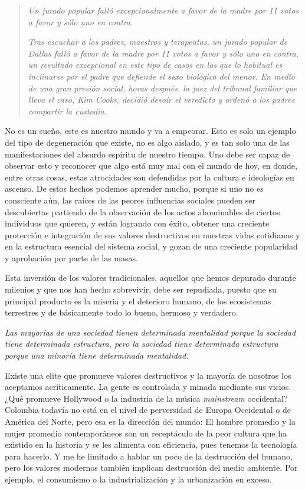\documentclass[12pt]{article}
\begin{document}
	\blockquote[]
	{\textit{Un jurado popular falló excepcionalmente a favor de la
	madre por 11 votos a favor y sólo uno en contra.}

	\textit{Tras escuchar a los padres, maestros y terapeutas, un jurado
	popular de Dallas falló a favor de la madre por 11 votos a favor
	y sólo uno en contra, un resultado excepcional en este tipo de
	casos en los que lo habitual es inclinarse por el padre que
	defiende el sexo biológico del menor. En medio de una gran
	presión social, horas después, la juez del tribunal familiar que
	lleva el caso, Kim Cooks, decidió desoír el veredicto y ordenó a
	los padres compartir la custodia.}}

	No es un sueño, este es nuestro mundo y va a empeorar. Esto es solo un
	ejemplo del tipo de degeneración que existe, no es algo aislado, y es
	tan solo una de las manifestaciones del absurdo espíritu de nuestro
	tiempo. Uno debe ser capaz de observar esto y reconocer que algo está
	muy mal con el mundo de hoy, en donde, entre otras cosas, estas
	atrocidades son defendidas por la cultura e ideologías en ascenso. De
	estos hechos podemos aprender mucho, porque si uno no es consciente aún,
	las raíces de las peores influencias sociales pueden ser descubiertas
	partiendo de la observación de los actos abominables de ciertos
	individuos que quieren, y están logrando con éxito, obtener una
	creciente protección e integración de sus valores destructivos en
	nuestras vidas cotidianas y en la estructura esencial del sistema
	social, y gozan de una creciente popularidad y aprobación por parte de
	las masas.

	Esta inversión de los valores tradicionales, aquellos que hemos depurado
	durante milenios y que nos han hecho sobrevivir, debe ser repudiada,
	puesto que su principal producto es la miseria y el deterioro
	humano, de los ecosistemas terrestres y de básicamente todo lo bueno,
	hermoso y verdadero.

	\begin{displayquote}
	\textit{Las mayorías de una sociedad tienen determinada mentalidad
	porque la sociedad tiene determinada estructura, pero la sociedad tiene
	determinada estructura porque una minoría tiene determinada mentalidad.}
	\end{displayquote}

	Existe una elite que promueve valores destructivos y la mayoría de
	nosotros los aceptamos acríticamente. La gente es controlada y
	minada mediante sus vicios. ¿Qué promueve Hollywood o la industria
	de la música \textit{mainstream} occidental? Colombia todavía no está
	en el nivel de perversidad de Europa Occidental o de América del Norte,
	pero esa es la dirección del mundo: El hombre promedio y la mujer
	promedio contemporáneos son un receptáculo de la peor cultura que ha
	existido en la historia y se les alimenta con eficiencia, pues tenemos
	la tecnología para hacerlo. Y me he limitado a hablar un poco de la
	destrucción del humano, pero los valores modernos también implican
	destrucción del medio ambiente. Por ejemplo, el consumismo o la
	industrialización y la urbanización en exceso.
\end{document}
